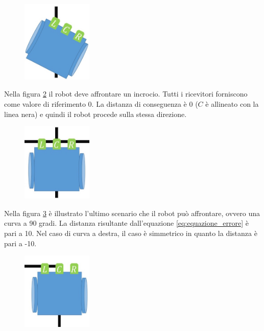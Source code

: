 \documentclass[twoside,twocolumn]{article}
\begin{document}
\begin{figure}[h]
	\centering
	\includegraphics[width=0.3\textwidth]{immagini/t1}
	\caption{}
	\label{fig:t1}
\end{figure}


Nella figura \ref{fig:t2} il robot deve affrontare un incrocio. Tutti i ricevitori forniscono come valore di riferimento 0. La distanza di conseguenza è 0 ($C$ è allineato con la linea nera) e quindi il robot procede sulla stessa direzione.

\begin{figure}[h]
	\centering
	\includegraphics[width=0.3\textwidth]{immagini/t2}
	\caption{}
	\label{fig:t2}
\end{figure}

Nella figura \ref{fig:t3} è illustrato l'ultimo scenario che il robot può affrontare, ovvero una curva a 90 gradi. La distanza risultante dall'equazione \ref{eq:equazione_errore} è pari a 10. Nel caso di curva a destra, il caso è simmetrico in quanto la distanza è pari a -10.

\begin{figure}[h]
	\centering
	\includegraphics[width=0.3\textwidth]{immagini/t3}
	\caption{}
	\label{fig:t3}
\end{figure}
\end{document}
